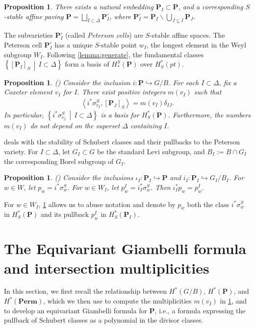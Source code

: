\documentclass[10pt]{article}
\numberwithin{thm}{section}
\newtheorem{prop}[thm]{Proposition}
\theoremstyle{definition}
\theoremstyle{remark}
\newcommand{\Pet}{\ensuremath{\mathbf{P}}}
\newcommand{\Perm}{\ensuremath{\mathbf{Perm}}}
\newcommand{\Fl}{\ensuremath{G/B}}
\newcommand{\set}[2]{\left\{#1\,\middle\vert\,#2\right\}}
\begin{document}
\begin{prop}\label{prop:vectorSpace}
There exists a natural embedding $\Pet_I\subset\Pet$,
and a corresponding $S$-stable affine paving $\Pet=\bigsqcup\limits_{I\subset\Delta}\Pet_I^\circ$,
where $\Pet_I^\circ=\Pet_I\backslash\bigcup\limits_{J\subsetneq I}\Pet_J$.
\end{prop}
The subvarieties $\Pet^\circ_I$ (called \emph{Peterson cells}) are $S$-stable affine spaces.
The Peterson cell $\Pet^\circ_I$ has a unique $S$-stable point $w_I$,
the longest element in the Weyl subgroup $W_I$.
Following \cref{lemma:generate},
the fundamental classes $\set{[\Pet_I]_S}{I\subset\Delta}$ form a basis of $H_*^S(\Pet)$ over $H^*_S(pt)$.


\begin{prop}
{\rm(\cite[Thm 4.3]{gms:peterson})}
\label{prop:duality}
Consider the inclusion $i:\Pet\hookrightarrow\Fl$.
For each $I\subset\Delta$, fix a Coxeter element $v_I$ for $I$.
There exist positive integers $m(v_I)$ such that
\begin{align*}
\left\langle i^*\sigma_{v_I}^S,[\Pet_J]_S\right\rangle=m(v_I)\delta_{IJ}.
\end{align*}
In particular, %
$\set{i^*\sigma_{v_I}^S}{I\subset \Delta}$ is a basis for $H^*_S(\Pet)$.
Furthermore, the numbers $m(v_I)$ do not depend on the superset $\Delta$ containing $I$.
\end{prop}

 deals with the stability of Schubert classes and their pullbacks to the Peterson variety.
For $I\subset\Delta$, let $G_I\subset G$ be the standard Levi subgroup,
and $B_I:=B\cap G_I$ the corresponding Borel subgroup of $G_I$.

\begin{prop}
{\rm(\cite[Thm 6.6]{gms:peterson})}
\label{stab1}
Consider the inclusions $\iota_I:\Pet_I\hookrightarrow\Pet$
and $i_I:\Pet_I\hookrightarrow G_I/B_I$.
For $w\in W$, let $p_w=i^*\sigma_w^S$.
For $w\in W_I$, let $p^I_w=i_I^*\sigma_w^S$.
Then $\iota_I^*p_w=p_w^I$.
\end{prop}


For $w\in W_I$, \cref{stab1} allows us to abuse notation and denote by $p_w$ both
the class $i^*\sigma_w^S$ in $H_S^*(\Pet)$ and its pullback $p_w^I$ in $H^*_S(\Pet_I)$.


\section{The Equivariant Giambelli formula and intersection multiplicities}
\label{sec:giambelli}
In this section, 
we first recall the relationship between $H^*(\Fl)$, $H^*(\Pet)$, and $H^*(\Perm)$,
which we then use to compute the multiplicities $m(v_I)$ in \cref{prop:duality},
and to develop an equivariant Giambelli formula for \Pet,
i.e., a formula expressing the pullback of Schubert classes as a polynomial in the divisor classes.
\end{document}
